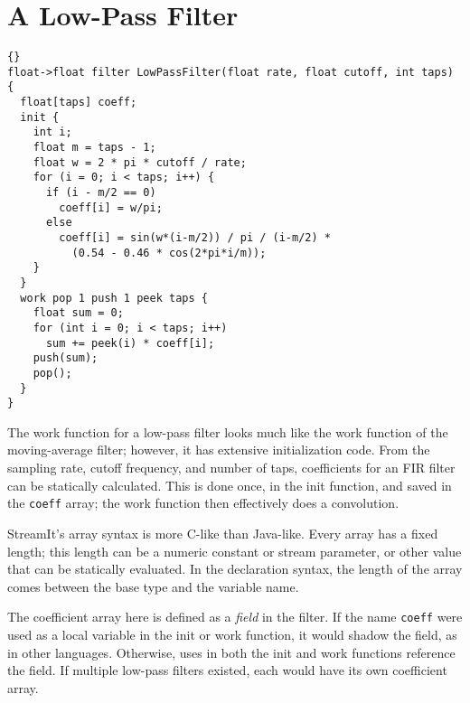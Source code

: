 \section{A Low-Pass Filter}

\begin{lstlisting}{}
float->float filter LowPassFilter(float rate, float cutoff, int taps) {
  float[taps] coeff;
  init {
    int i;
    float m = taps - 1;
    float w = 2 * pi * cutoff / rate;
    for (i = 0; i < taps; i++) {
      if (i - m/2 == 0)
        coeff[i] = w/pi;
      else
        coeff[i] = sin(w*(i-m/2)) / pi / (i-m/2) *
          (0.54 - 0.46 * cos(2*pi*i/m));
    }
  }
  work pop 1 push 1 peek taps {
    float sum = 0;
    for (int i = 0; i < taps; i++)
      sum += peek(i) * coeff[i];
    push(sum);
    pop();
  }
}
\end{lstlisting}

The work function for a low-pass filter looks much like the work
function of the moving-average filter; however, it has extensive
initialization code.  From the sampling rate, cutoff frequency, and
number of taps, coefficients for an FIR filter can be statically
calculated.  This is done once, in the init function, and saved in the
\lstinline|coeff| array; the work function then effectively does a
convolution.

StreamIt's array syntax is more C-like than Java-like.  Every array
has a fixed length; this length can be a numeric constant or stream
parameter, or other value that can be statically evaluated.  In the
declaration syntax, the length of the array comes between the base
type and the variable name.

The coefficient array here is defined as a \emph{field} in the
filter.  If the name \lstinline|coeff| were used as a local variable
in the init or work function, it would shadow the field, as in other
languages.  Otherwise, uses in both the init and work functions
reference the field.  If multiple low-pass filters existed, each would
have its own coefficient array.
